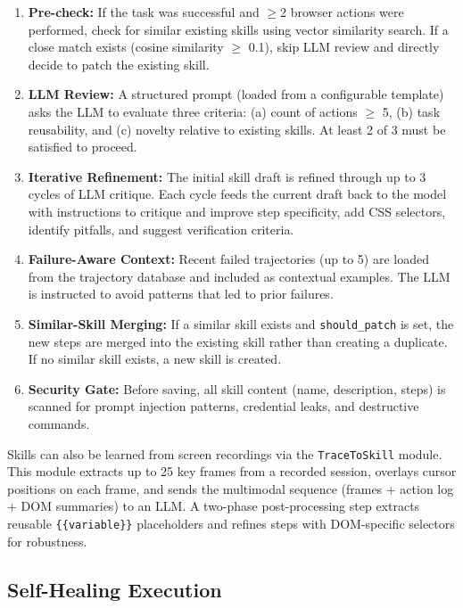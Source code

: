 \begin{enumerate}[leftmargin=*,itemsep=1pt]
    \item \textbf{Pre-check:} If the task was successful and $\geq$2 browser actions were performed, check for similar existing skills using vector similarity search. If a close match exists (cosine similarity $\geq$ 0.1), skip LLM review and directly decide to patch the existing skill.
    \item \textbf{LLM Review:} A structured prompt (loaded from a configurable template) asks the LLM to evaluate three criteria: (a) count of actions $\geq$ 5, (b) task reusability, and (c) novelty relative to existing skills. At least 2 of 3 must be satisfied to proceed.
    \item \textbf{Iterative Refinement:} The initial skill draft is refined through up to 3 cycles of LLM critique. Each cycle feeds the current draft back to the model with instructions to critique and improve step specificity, add CSS selectors, identify pitfalls, and suggest verification criteria.
    \item \textbf{Failure-Aware Context:} Recent failed trajectories (up to 5) are loaded from the trajectory database and included as contextual examples. The LLM is instructed to avoid patterns that led to prior failures.
    \item \textbf{Similar-Skill Merging:} If a similar skill exists and \texttt{should\_patch} is set, the new steps are merged into the existing skill rather than creating a duplicate. If no similar skill exists, a new skill is created.
    \item \textbf{Security Gate:} Before saving, all skill content (name, description, steps) is scanned for prompt injection patterns, credential leaks, and destructive commands.
\end{enumerate}

Skills can also be learned from screen recordings via the \texttt{TraceToSkill} module. This module extracts up to 25 key frames from a recorded session, overlays cursor positions on each frame, and sends the multimodal sequence (frames + action log + DOM summaries) to an LLM. A two-phase post-processing step extracts reusable \texttt{\{\{variable\}\}} placeholders and refines steps with DOM-specific selectors for robustness.

\subsection{Self-Healing Execution}

